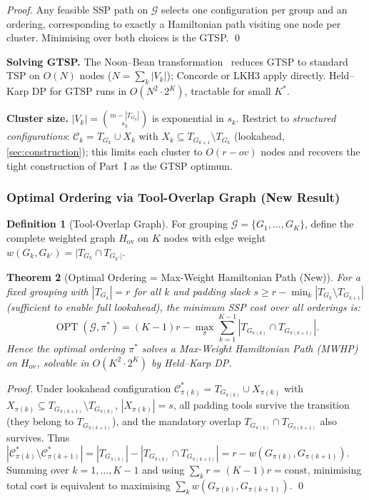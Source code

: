 \documentclass[11pt,a4paper]{article}
\theoremstyle{plain}
\newtheorem{theorem}{Theorem}[section]
\theoremstyle{definition}
\newtheorem{definition}[theorem]{Definition}
\DeclareMathOperator{\OPT}{OPT}
\newcommand{\calG}{\mathcal{G}}
\newcommand{\Kstar}{K^{*}}
\begin{document}
\begin{proof}
Any feasible SSP path on $\calG$ selects one configuration per group and an ordering,
corresponding to exactly a Hamiltonian path visiting one node per cluster.
Minimising over both choices is the GTSP. \qed
\end{proof}

\noindent\textbf{Solving GTSP.}
The Noon--Bean transformation~\cite{NoonBean1993} reduces GTSP to standard TSP
on $O(N)$ nodes ($N=\sum_k|V_k|$); Concorde or LKH3 apply directly.
Held--Karp DP for GTSP runs in $O(N^2\cdot 2^K)$, tractable for small $\Kstar$.

\noindent\textbf{Cluster size.}
$|V_k|=\binom{m-|T_{G_k}|}{s_k}$ is exponential in $s_k$.
Restrict to \emph{structured configurations}:
$\mathcal{C}_k=T_{G_k}\cup X_k$ with $X_k\subseteq T_{G_{k+1}}\setminus T_{G_k}$
(lookahead, \cref{sec:construction}); this limits each cluster to $O(r-\mathit{ov})$
nodes and recovers the tight construction of Part~I as the GTSP optimum.

\subsubsection{Optimal Ordering via Tool-Overlap Graph (New Result)}
\label{sec:overlap}

\begin{definition}[Tool-Overlap Graph]
For grouping $\calG=\{G_1,\ldots,G_K\}$, define the complete weighted graph
$H_{\mathrm{ov}}$ on $K$ nodes with edge weight
$w(G_k,G_{k'})=|T_{G_k}\cap T_{G_{k'}|}$.
\end{definition}

\begin{thmbox}
\begin{theorem}[Optimal Ordering = Max-Weight Hamiltonian Path (New)]
\label{thm:overlap}
For a fixed grouping with $|T_{G_k}|=r$ for all $k$ and padding slack
$s\ge r-\min_{k}|T_{G_k}\setminus T_{G_{k+1}}|$ (sufficient to enable full
lookahead), the minimum SSP cost over all orderings is:
\[
  \OPT(\calG,\pi^*)
  =(K-1)r - \max_\pi\sum_{k=1}^{K-1}|T_{G_{\pi(k)}}\cap T_{G_{\pi(k+1)}}|.
\]
Hence the optimal ordering $\pi^*$ solves a Max-Weight Hamiltonian Path (MWHP)
on $H_{\mathrm{ov}}$, solvable in $O(K^2\cdot 2^K)$ by Held--Karp DP.
\end{theorem}
\end{thmbox}

\begin{proof}
Under lookahead configuration $\mathcal{C}_{\pi(k)}^*=T_{G_{\pi(k)}}\cup X_{\pi(k)}$
with $X_{\pi(k)}\subseteq T_{G_{\pi(k+1)}}\setminus T_{G_{\pi(k)}}$, $|X_{\pi(k)}|=s$,
all padding tools survive the transition (they belong to $T_{G_{\pi(k+1)}}$),
and the mandatory overlap $T_{G_{\pi(k)}}\cap T_{G_{\pi(k+1)}}$ also survives.
Thus
$|\mathcal{C}_{\pi(k)}^*\setminus\mathcal{C}_{\pi(k+1)}^*|
=|T_{G_{\pi(k)}}|-|T_{G_{\pi(k)}}\cap T_{G_{\pi(k+1)}}|
=r-w(G_{\pi(k)},G_{\pi(k+1)})$.
Summing over $k=1,\ldots,K-1$ and using $\sum_k r=(K-1)r=\text{const}$,
minimising total cost is equivalent to maximising $\sum_k w(G_{\pi(k)},G_{\pi(k+1)})$. \qed
\end{proof}
\end{document}
